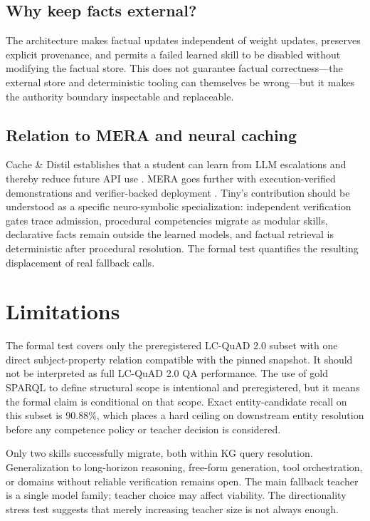 \documentclass[10pt]{article}
\begin{document}
\subsection{Why keep facts external?}
The architecture makes factual updates independent of weight updates, preserves explicit provenance, and permits a failed learned skill to be disabled without modifying the factual store. This does not guarantee factual correctness---the external store and deterministic tooling can themselves be wrong---but it makes the authority boundary inspectable and replaceable.

\subsection{Relation to MERA and neural caching}
Cache \& Distil establishes that a student can learn from LLM escalations and thereby reduce future API use \cite{ramirez2024cache}. MERA goes further with execution-verified demonstrations and verifier-backed deployment \cite{yao2026mera}. Tiny's contribution should be understood as a specific neuro-symbolic specialization: independent verification gates trace admission, procedural competencies migrate as modular skills, declarative facts remain outside the learned models, and factual retrieval is deterministic after procedural resolution. The formal test quantifies the resulting displacement of real fallback calls.

\section{Limitations}
The formal test covers only the preregistered LC-QuAD 2.0 subset with one direct subject-property relation compatible with the pinned snapshot. It should not be interpreted as full LC-QuAD 2.0 QA performance. The use of gold SPARQL to define structural scope is intentional and preregistered, but it means the formal claim is conditional on that scope. Exact entity-candidate recall on this subset is 90.88\%, which places a hard ceiling on downstream entity resolution before any competence policy or teacher decision is considered.

Only two skills successfully migrate, both within KG query resolution. Generalization to long-horizon reasoning, free-form generation, tool orchestration, or domains without reliable verification remains open. The main fallback teacher is a single model family; teacher choice may affect viability. The directionality stress test suggests that merely increasing teacher size is not always enough.
\end{document}
